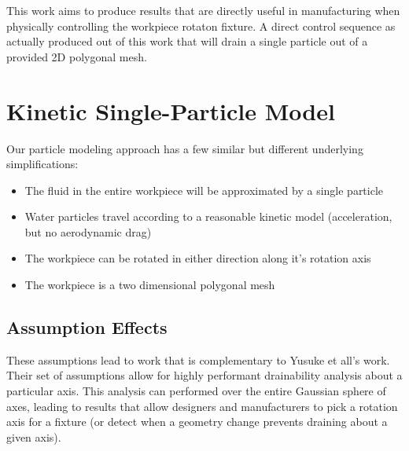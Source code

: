 

This work aims to produce results that are directly useful in manufacturing when physically controlling the workpiece rotaton fixture. A direct control sequence as actually produced out of this work that will drain a single particle out of a provided 2D polygonal mesh.

\section{Kinetic Single-Particle Model}

Our particle modeling approach has a few similar but different underlying simplifications:

\begin{itemize}
	\item The fluid in the entire workpiece will be approximated by a single particle
	\item Water particles travel according to a reasonable kinetic model (acceleration, but no aerodynamic drag)
	\item The workpiece can be rotated in either direction along it's rotation axis
	\item The workpiece is a two dimensional polygonal mesh
\end{itemize}

	\subsection{Assumption Effects}

These assumptions lead to work that is complementary to Yusuke et all's work. Their set of assumptions allow for highly performant drainability analysis about a particular axis. This analysis can performed over the entire Gaussian sphere of axes, leading to results that allow designers and manufacturers to pick a rotation axis for a fixture (or detect when a geometry change prevents draining about a given axis).




